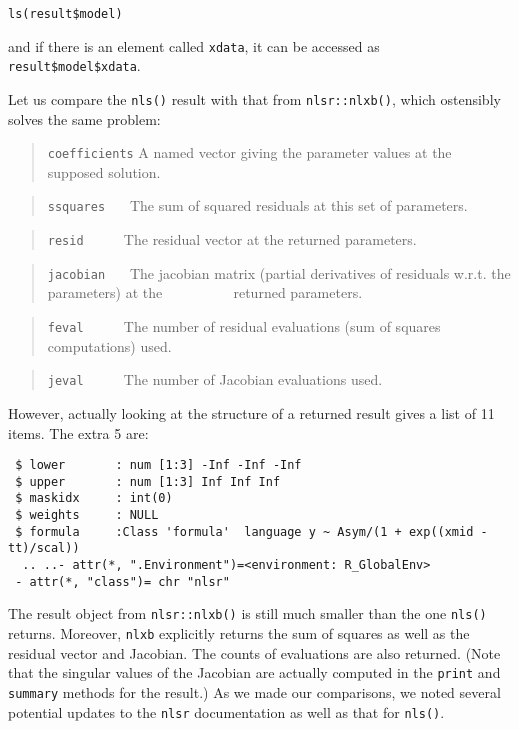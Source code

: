 \documentclass[
]{article}
\begin{document}
\begin{verbatim}
ls(result$model)
\end{verbatim}

and if there is an element called \texttt{xdata}, it can be accessed as
\texttt{result\$model\$xdata}.

Let us compare the \texttt{nls()} result with that from
\texttt{nlsr::nlxb()}, which ostensibly solves the same problem:

\begin{quote}
\texttt{coefficients} A named vector giving the parameter values at the
supposed solution.
\end{quote}

\begin{quote}
\texttt{ssquares} \(~~~~~\) The sum of squared residuals at this set of
parameters.
\end{quote}

\begin{quote}
\texttt{resid} \(~~~~~~~~~~\) The residual vector at the returned
parameters.
\end{quote}

\begin{quote}
\texttt{jacobian} \(~~~~~\) The jacobian matrix (partial derivatives of
residuals w.r.t. the parameters) at the \newline
\(~~~~~~~~~~~~~~~~~~~~\) returned parameters.
\end{quote}

\begin{quote}
\texttt{feval} \(~~~~~~~~~~\) The number of residual evaluations (sum of
squares computations) used.
\end{quote}

\begin{quote}
\texttt{jeval} \(~~~~~~~~~~\) The number of Jacobian evaluations used.
\end{quote}

However, actually looking at the structure of a returned result gives a
list of 11 items. The extra 5 are:

\begin{verbatim}
 $ lower       : num [1:3] -Inf -Inf -Inf
 $ upper       : num [1:3] Inf Inf Inf
 $ maskidx     : int(0) 
 $ weights     : NULL
 $ formula     :Class 'formula'  language y ~ Asym/(1 + exp((xmid - tt)/scal))
  .. ..- attr(*, ".Environment")=<environment: R_GlobalEnv> 
 - attr(*, "class")= chr "nlsr"
\end{verbatim}

The result object from \texttt{nlsr::nlxb()} is still much smaller than
the one \texttt{nls()} returns. Moreover, \texttt{nlxb} explicitly
returns the sum of squares as well as the residual vector and Jacobian.
The counts of evaluations are also returned. (Note that the singular
values of the Jacobian are actually computed in the \texttt{print} and
\texttt{summary} methods for the result.) As we made our comparisons, we
noted several potential updates to the \texttt{nlsr} documentation as
well as that for \texttt{nls()}.
\end{document}
